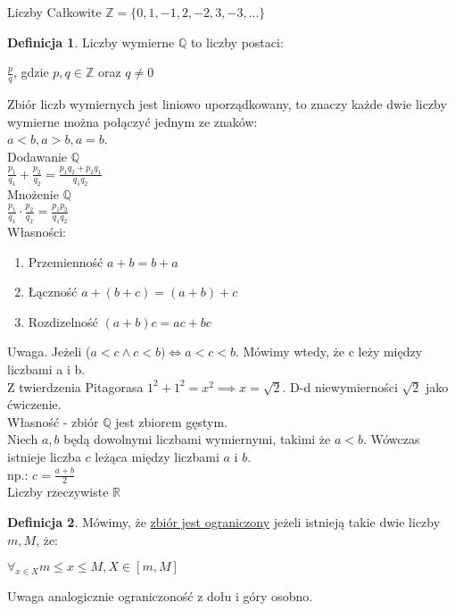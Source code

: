 \documentclass{article}
\theoremstyle{definition}
\newtheorem{de}{Definicja}[subsection]
\theoremstyle{definition}
\theoremstyle{definition}
\theoremstyle{definition}
\begin{document}
Liczby Całkowite $\mathbb{Z}=\{0,1,-1,2,-2,3,-3,...\}$

\begin{de}
    Liczby wymierne $\mathbb{Q}$ to liczby postaci:\\
    \begin{center}
        $\frac{p}{q}$, gdzie $p,q\in\mathbb{Z}$ oraz $q\neq0$
    \end{center}
    Zbiór liczb wymiernych jest liniowo uporządkowany, to znaczy każde dwie liczby wymierne można połączyć jednym ze znaków:\\
    $a<b, a>b, a=b$.\\
    Dodawanie $\mathbb{Q}$\\
    $\frac{p_1}{q_1}+\frac{p_2}{q_2}=\frac{p_1q_2 + p_2q_1}{q_1q_2}$\\
    Mnożenie $\mathbb{Q}$\\
    $\frac{p_1}{q_1} \cdot \frac{p_2}{q_2} = \frac{p_1p_2}{q_1q_2}$\\
    Własności:\\
    \begin{enumerate}
        \item Przemienność $a+b=b+a$
        \item Łączność $a+(b+c)=(a+b)+c$
        \item Rozdizelność $(a+b)c=ac+bc$
    \end{enumerate}
\end{de}

Uwaga. Jeżeli ($a<c \land c<b) \iff a<c<b$. Mówimy wtedy, że c leży między liczbami a i b.\\
Z twierdzenia Pitagorasa $1^2+1^2=x^2 \implies x=\sqrt{2}$. D-d niewymierności $\sqrt{2}$ jako ćwiczenie.\\

Własność - zbiór $\mathbb{Q}$ jest zbiorem gęstym.\\
Niech $a,b$ będą dowolnymi liczbami wymiernymi, takimi że $a<b$. Wówczas istnieje liczba $c$ leżąca między liczbami $a$ i $b$.\\
np.: $c=\frac{a+b}{2}$\\

Liczby rzeczywiste $\mathbb{R}$

\begin{de}
    Mówimy, że \underline{zbiór jest ograniczony} jeżeli istnieją takie dwie liczby $m, M$, że:
    \begin{center}
        $\forall_{x\in X} m\leq x\leq M, X\in[m,M]$
    \end{center}
    Uwaga analogicznie ograniczoność z dołu i góry osobno.
\end{de}
\end{document}
